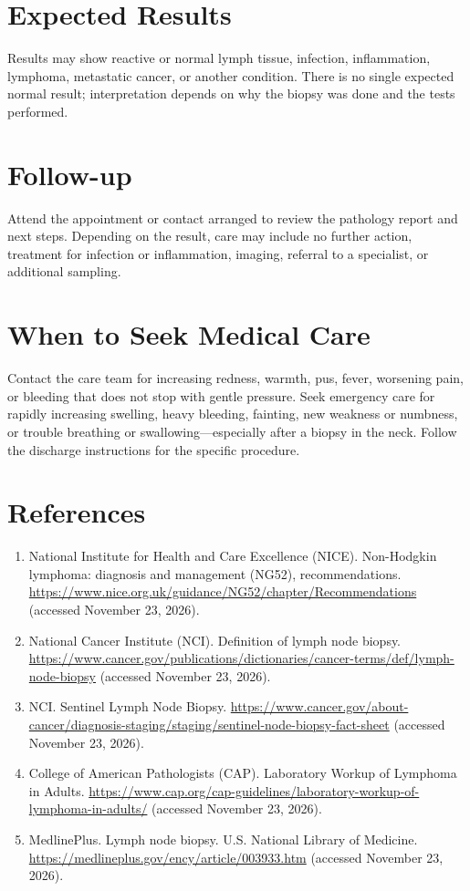 \section*{Expected Results}
Results may show reactive or normal lymph tissue, infection, inflammation, lymphoma, metastatic cancer, or another condition. There is no single expected normal result; interpretation depends on why the biopsy was done and the tests performed.

\section*{Follow-up}
Attend the appointment or contact arranged to review the pathology report and next steps. Depending on the result, care may include no further action, treatment for infection or inflammation, imaging, referral to a specialist, or additional sampling.

\section*{When to Seek Medical Care}
Contact the care team for increasing redness, warmth, pus, fever, worsening pain, or bleeding that does not stop with gentle pressure. Seek emergency care for rapidly increasing swelling, heavy bleeding, fainting, new weakness or numbness, or trouble breathing or swallowing—especially after a biopsy in the neck. Follow the discharge instructions for the specific procedure.

\section*{References}
\begin{enumerate}
  \item National Institute for Health and Care Excellence (NICE). Non-Hodgkin lymphoma: diagnosis and management (NG52), recommendations. \url{https://www.nice.org.uk/guidance/NG52/chapter/Recommendations} (accessed November 23, 2026).
  \item National Cancer Institute (NCI). Definition of lymph node biopsy. \url{https://www.cancer.gov/publications/dictionaries/cancer-terms/def/lymph-node-biopsy} (accessed November 23, 2026).
  \item NCI. Sentinel Lymph Node Biopsy. \url{https://www.cancer.gov/about-cancer/diagnosis-staging/staging/sentinel-node-biopsy-fact-sheet} (accessed November 23, 2026).
  \item College of American Pathologists (CAP). Laboratory Workup of Lymphoma in Adults. \url{https://www.cap.org/cap-guidelines/laboratory-workup-of-lymphoma-in-adults/} (accessed November 23, 2026).
  \item MedlinePlus. Lymph node biopsy. U.S. National Library of Medicine. \url{https://medlineplus.gov/ency/article/003933.htm} (accessed November 23, 2026).
\end{enumerate}

\clearpage
